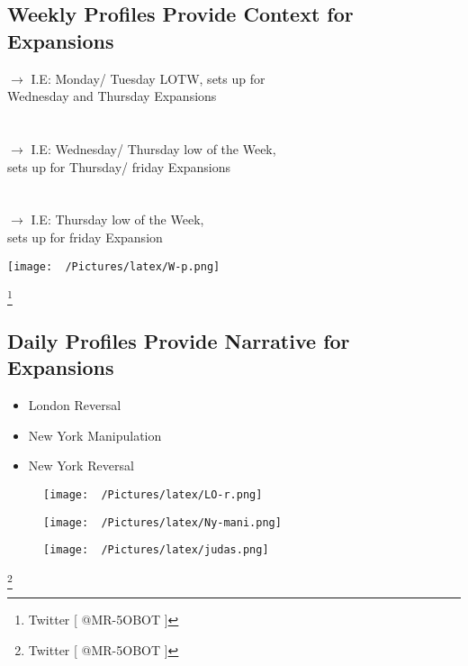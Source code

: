 \documentclass{article}
\begin{document}
\subsection{Weekly Profiles Provide Context for Expansions}
\begin{SCfigure}[0.2][h]
\begin{minipage}{0.56\textwidth}
\large{$ \rightarrow $ {\color[HTML]{68528D}I.E:} Monday/ Tuesday LOTW, sets up for\\ Wednesday and Thursday Expansions  \\\\\\
$ \rightarrow $ {\color[HTML]{68528D}I.E:} Wednesday/ Thursday low of the Week,\\ sets up for Thursday/ friday Expansions \\\\\\
$ \rightarrow $ {\color[HTML]{68528D}I.E:} Thursday low of the Week,\\ sets up for friday Expansion}
\end{minipage}

\begin{minipage}{0.4\textwidth}
    \centering
    \texttt{[image: ~/Pictures/latex/W-p.png]}
\end{minipage}
\end{SCfigure}

\footnote{Twitter [ @MR-5OBOT ]}
\newpage

\subsection{Daily Profiles Provide Narrative for Expansions}
\vspace{.5cm}
\begin{itemize}
  \item London Reversal
  \item New York Manipulation
  \item New York Reversal
\end{itemize}
\begin{figure}[h]
    \centering
    \begin{minipage}{0.42\textwidth}
        \texttt{[image: ~/Pictures/latex/LO-r.png]}
    \end{minipage}
    \begin{minipage}{0.42\textwidth}
        \texttt{[image: ~/Pictures/latex/Ny-mani.png]}
    \end{minipage}
    \begin{minipage}{0.42\textwidth}
        \texttt{[image: ~/Pictures/latex/judas.png]}
    \end{minipage}
\end{figure}
\footnote{Twitter [ @MR-5OBOT ]}
\end{document}
